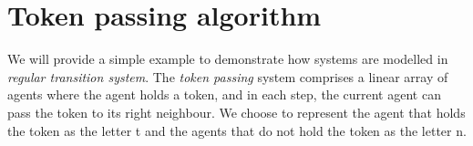 \section*{Token passing algorithm}\label{example:token-passing}
We will provide a simple example to demonstrate how systems are 
modelled in \textit{regular transition system}.
The \textit{token passing} system comprises a linear array of agents where the 
agent holds a token, and in each step, the current agent can pass 
the token to its right neighbour. We choose to represent the agent that holds 
the token as the letter t and the agents that do not hold the token
as the letter n.

